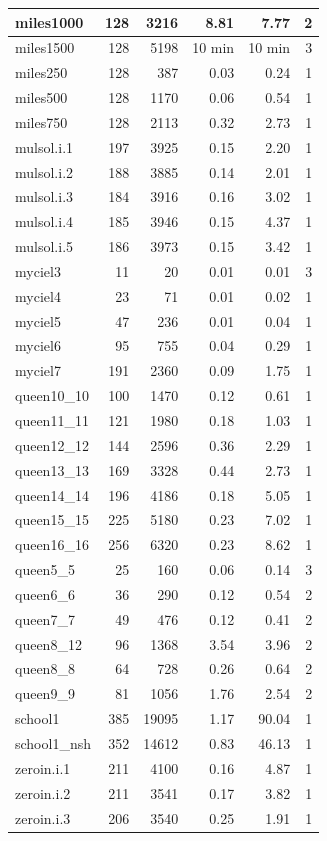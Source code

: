 \begin{table}[H]
\begin{tabular}{|l|r|r|r|r|r|}
miles1000 & 128 & 3216 & 8.81 & 7.77 & 2 \\ \hline
miles1500 & 128 & 5198 & 10 min & 10 min & 3 \\ \hline
miles250 & 128 & 387 & 0.03 & 0.24 & 1 \\ \hline
miles500 & 128 & 1170 & 0.06 & 0.54 & 1 \\ \hline
miles750 & 128 & 2113 & 0.32 & 2.73 & 1 \\ \hline
mulsol.i.1 & 197 & 3925 & 0.15 & 2.20 & 1 \\ \hline
mulsol.i.2 & 188 & 3885 & 0.14 & 2.01 & 1 \\ \hline
mulsol.i.3 & 184 & 3916 & 0.16 & 3.02 & 1 \\ \hline
mulsol.i.4 & 185 & 3946 & 0.15 & 4.37 & 1 \\ \hline
mulsol.i.5 & 186 & 3973 & 0.15 & 3.42 & 1 \\ \hline
myciel3 & 11 & 20 & 0.01 & 0.01 & 3 \\ \hline
myciel4 & 23 & 71 & 0.01 & 0.02 & 1 \\ \hline
myciel5 & 47 & 236 & 0.01 & 0.04 & 1 \\ \hline
myciel6 & 95 & 755 & 0.04 & 0.29 & 1 \\ \hline
myciel7 & 191 & 2360 & 0.09 & 1.75 & 1 \\ \hline
queen10\_10 & 100 & 1470 & 0.12 & 0.61 & 1 \\ \hline
queen11\_11 & 121 & 1980 & 0.18 & 1.03 & 1 \\ \hline
queen12\_12 & 144 & 2596 & 0.36 & 2.29 & 1 \\ \hline
queen13\_13 & 169 & 3328 & 0.44 & 2.73 & 1 \\ \hline
queen14\_14 & 196 & 4186 & 0.18 & 5.05 & 1 \\ \hline
queen15\_15 & 225 & 5180 & 0.23 & 7.02 & 1 \\ \hline
queen16\_16 & 256 & 6320 & 0.23 & 8.62 & 1 \\ \hline
queen5\_5 & 25 & 160 & 0.06 & 0.14 & 3 \\ \hline
queen6\_6 & 36 & 290 & 0.12 & 0.54 & 2 \\ \hline
queen7\_7 & 49 & 476 & 0.12 & 0.41 & 2 \\ \hline
queen8\_12 & 96 & 1368 & 3.54 & 3.96 & 2 \\ \hline
queen8\_8 & 64 & 728 & 0.26 & 0.64 & 2 \\ \hline
queen9\_9 & 81 & 1056 & 1.76 & 2.54 & 2 \\ \hline
school1 & 385 & 19095 & 1.17 & 90.04 & 1 \\ \hline
school1\_nsh & 352 & 14612 & 0.83 & 46.13 & 1 \\ \hline
zeroin.i.1 & 211 & 4100 & 0.16 & 4.87 & 1 \\ \hline
zeroin.i.2 & 211 & 3541 & 0.17 & 3.82 & 1 \\ \hline
zeroin.i.3 & 206 & 3540 & 0.25 & 1.91 & 1 \\ \hline
\end{tabular}
\end{table}

